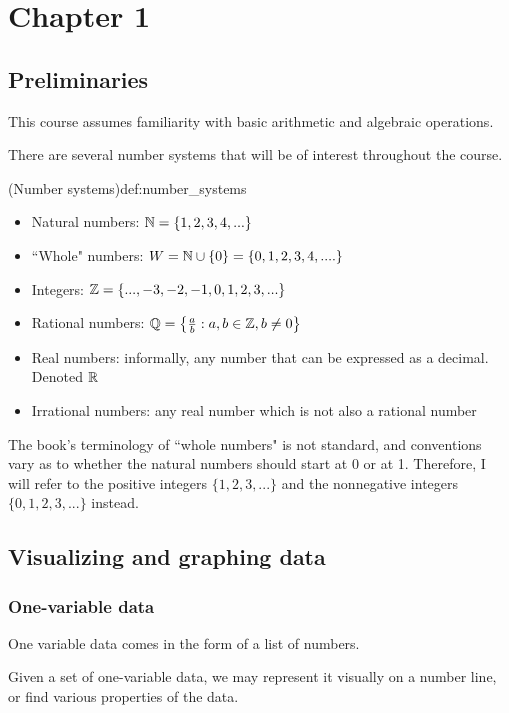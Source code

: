 \documentclass{article}
\begin{document}

\section{Chapter 1}
\subsection{Preliminaries}

This course assumes familiarity with basic arithmetic and algebraic operations.

There are several number systems that will be of interest throughout the course.
\begin{definition}{(Number systems)}{def:number_systems}
    \begin{itemize}
        \item Natural numbers: $\mathbb{N}=\{1,2,3,4,...\}$
        \item ``Whole" numbers: $W=\mathbb{N}\cup\{0\}=\{0,1,2,3,4,....\}$
        \item Integers: $\mathbb{Z}=\{...,-3,-2,-1,0,1,2,3,...\}$
        \item Rational numbers: $\mathbb{Q}=\left\{\frac{a}{b}:a,b\in\mathbb{Z},b\neq0\right\}$
        \item Real numbers: informally, any number that can be expressed as a decimal. Denoted $\mathbb{R}$
        \item Irrational numbers: any real number which is not also a rational number
    \end{itemize}
\end{definition}

The book's terminology of ``whole numbers" is not standard, and conventions vary as to whether the natural numbers should start at 0 or at 1. Therefore, I will refer to the positive integers $\{1,2,3,...\}$ and the nonnegative integers $\{0,1,2,3,...\}$ instead.

\subsection{Visualizing and graphing data}
\subsubsection{One-variable data}

One variable data comes in the form of a list of numbers.

Given a set of one-variable data, we may represent it visually on a number line, or find various properties of the data. 
\end{document}
